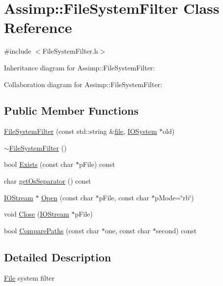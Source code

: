 \hypertarget{class_assimp_1_1_file_system_filter}{\section{Assimp\+:\+:File\+System\+Filter Class Reference}
\label{class_assimp_1_1_file_system_filter}
}


{\ttfamily \#include $<$File\+System\+Filter.\+h$>$}



Inheritance diagram for Assimp\+:\+:File\+System\+Filter\+:


Collaboration diagram for Assimp\+:\+:File\+System\+Filter\+:
\subsection*{Public Member Functions}
\begin{DoxyCompactItemize}
\item 
\hyperlink{class_assimp_1_1_file_system_filter_ac9329a3a44b37549cf7840bc69f96f3b}{File\+System\+Filter} (const std\+::string \&\hyperlink{structfile}{file}, \hyperlink{class_assimp_1_1_i_o_system}{I\+O\+System} $\ast$old)
\item 
\hyperlink{class_assimp_1_1_file_system_filter_aae5aee345cad1f4f242d1ce392327f5a}{$\sim$\+File\+System\+Filter} ()
\item 
bool \hyperlink{class_assimp_1_1_file_system_filter_a8f5b19497580ed96318663277782641b}{Exists} (const char $\ast$p\+File) const 
\item 
char \hyperlink{class_assimp_1_1_file_system_filter_abb11e07d4b180b4aacef5b9b1c9958a6}{get\+Os\+Separator} () const 
\item 
\hyperlink{class_assimp_1_1_i_o_stream}{I\+O\+Stream} $\ast$ \hyperlink{class_assimp_1_1_file_system_filter_a47cd9fadf4090ad8a12ba925efed42e9}{Open} (const char $\ast$p\+File, const char $\ast$p\+Mode=\char`\"{}rb\char`\"{})
\item 
void \hyperlink{class_assimp_1_1_file_system_filter_a1cf69a7931a31596eefba4fc442bc90f}{Close} (\hyperlink{class_assimp_1_1_i_o_stream}{I\+O\+Stream} $\ast$p\+File)
\item 
bool \hyperlink{class_assimp_1_1_file_system_filter_ae4e3f3d8d868b1c09ad927419a4b14e6}{Compare\+Paths} (const char $\ast$one, const char $\ast$second) const 
\end{DoxyCompactItemize}


\subsection{Detailed Description}
\hyperlink{class_file}{File} system filter 

